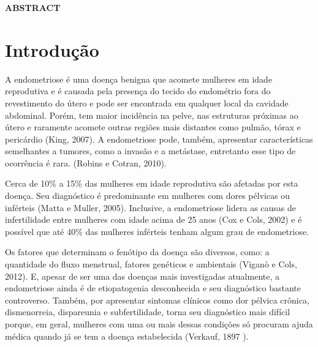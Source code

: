 \documentclass[12pt]{article} %
\begin{document}
\newpage\MakeUppercase{\textbf{Abstract}}



\newpage

\listoffigures



\newpage

\tableofcontents


\newpage








\newpage


\section{Introdução}

A endometriose é uma doença benigna que acomete mulheres em idade
reprodutiva e é causada pela presença do tecido do endométrio fora do
revestimento do útero e pode ser encontrada em qualquer local da
cavidade abdominal. Porém, tem maior incidência na pelve, nas
estruturas próximas ao útero e raramente acomete outras regiões mais
distantes como pulmão, tórax e pericárdio (King, 2007). A endometriose
pode, também, apresentar características semelhantes a tumores, como a
invasão e a metástase, entretanto esse tipo de ocorrência é
rara. (Robins e Cotran, 2010).

Cerca de 10\% a 15\% das mulheres em idade reprodutiva são afetadas
por esta doença. Seu diagnóstico é predominante em mulheres com dores
pélvicas ou inférteis (Matta e Muller, 2005).  Inclusive, a
endometriose lidera as causas de infertilidade entre mulheres com
idade acima de 25 anos (Cox e Cols, 2002) e é possível que até 40\%
das mulheres inférteis tenham algum grau de endometriose.

Os fatores que determinam o fenótipo da doença são diversos, como: a
quantidade do fluxo menstrual, fatores genéticos e ambientais (Viganò
e Cols, 2012). E, apesar de ser uma das doenças mais investigadas
atualmente, a endometriose ainda é de etiopatogenia desconhecida e seu
diagnóstico bastante controverso. Também, por apresentar sintomas
clínicos como dor pélvica crônica, dismenorreia, dispareunia e
subfertilidade, torna seu diagnóstico mais difícil porque, em geral,
mulheres com uma ou mais dessas condições só procuram ajuda médica
quando já se tem a doença estabelecida (Verkauf, 1897 ). 
\end{document}
